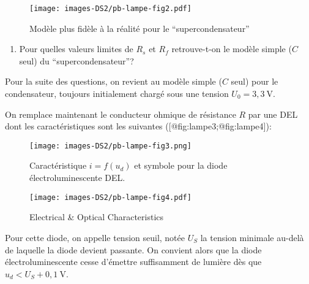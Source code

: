 \begin{figure}
\hypertarget{fig:lampe2}{%
\centering
\texttt{[image: images-DS2/pb-lampe-fig2.pdf]}
\caption{Modèle plus fidèle à la réalité pour le
``supercondensateur''}\label{fig:lampe2}
}
\end{figure}

\begin{enumerate}
\def\labelenumi{\arabic{enumi}.}
\setcounter{enumi}{2}
\tightlist
\item
  Pour quelles valeurs limites de \(R_s\) et \(R_f\) retrouve-t-on le
  modèle simple (\(C\) seul) du ``supercondensateur''?
\end{enumerate}

Pour la suite des questions, on revient au modèle simple (\(C\) seul)
pour le condensateur, toujours initialement chargé sous une tension
\(U_0 = 3,3\ \mathrm{V}\).

On remplace maintenant le conducteur ohmique de résistance \(R\) par une
DEL dont les caractéristiques sont les suivantes
({[}@fig:lampe3;@fig:lampe4{]}):

\begin{figure}
\hypertarget{fig:lampe3}{%
\centering
\texttt{[image: images-DS2/pb-lampe-fig3.png]}
\caption{Caractéristique \(i=f(u_d)\) et symbole pour la diode
électroluminescente DEL.}\label{fig:lampe3}
}
\end{figure}

\begin{figure}
\hypertarget{fig:lampe4}{%
\centering
\texttt{[image: images-DS2/pb-lampe-fig4.pdf]}
\caption{Electrical \& Optical Characteristics}\label{fig:lampe4}
}
\end{figure}

Pour cette diode, on appelle tension seuil, notée \(U_S\) la tension
minimale au-delà de laquelle la diode devient passante. On convient
alors que la diode électroluminescente cesse d'émettre suffisamment de
lumière dès que \(u_d < U_S + 0,1\ \mathrm{V}\).

